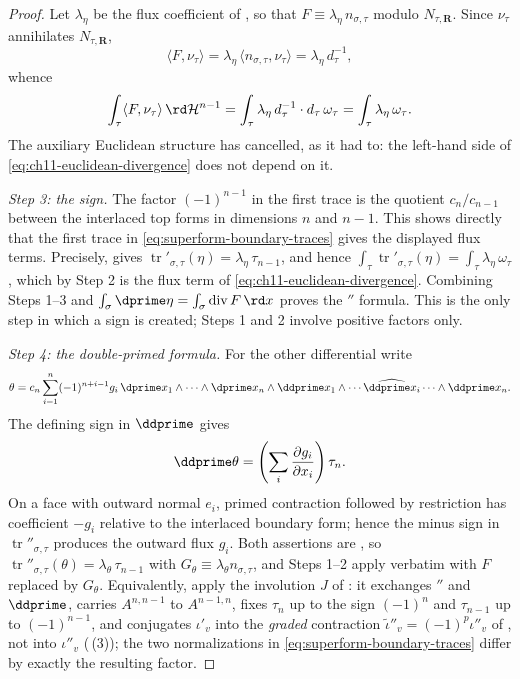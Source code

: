 \begin{proof}
Let $\lambda_\eta$ be the flux coefficient of
, so that $F\equiv\lambda_\eta\,n_{\sigma,\tau}$
modulo $N_{\tau,\mathbf R}$.  Since $\nu_\tau$ annihilates
$N_{\tau,\mathbf R}$,
\[
 \langle F,\nu_\tau\rangle
 =\lambda_\eta\,\langle n_{\sigma,\tau},\nu_\tau\rangle
 =\lambda_\eta\,d_\tau^{-1},
\]
whence
\[
 \int_\tau\langle F,\nu_\tau\rangle\,\rd\mathcal H^{n-1}
 =\int_\tau\lambda_\eta\,d_\tau^{-1}\cdot d_\tau\,\omega_\tau
 =\int_\tau\lambda_\eta\,\omega_\tau .
\]
The auxiliary Euclidean structure has cancelled, as it had to: the left-hand
side of \eqref{eq:ch11-euclidean-divergence} does not depend on it.

\smallskip
\emph{Step 3: the sign.}
The factor $(-1)^{n-1}$ in the first trace is the quotient
$c_n/c_{n-1}$ between the interlaced top forms in dimensions $n$ and
$n-1$.  This shows directly that the first trace in
\eqref{eq:superform-boundary-traces} gives the displayed flux terms.
Precisely,  gives
$\operatorname{tr}'_{\sigma,\tau}(\eta)=\lambda_\eta\,\tau_{n-1}$, and hence
$\int_\tau\operatorname{tr}'_{\sigma,\tau}(\eta)
=\int_\tau\lambda_\eta\,\omega_\tau$, which by Step 2 is the flux term of
\eqref{eq:ch11-euclidean-divergence}.  Combining Steps 1--3 and
$\int_\sigma\dprime\eta=\int_\sigma\operatorname{div}F\,\rd x$ proves the
$\dprime$ formula.  This is the only step in which a sign is created; Steps
1 and 2 involve positive factors only.

\smallskip
\emph{Step 4: the double-primed formula.}
For the other differential write
\[
 \theta=c_n\sum_{i=1}^n(-1)^{n+i-1}g_i\,
 \dprime x_1\wedge\cdots\wedge\dprime x_n
 \wedge\ddprime x_1\wedge\cdots
       \widehat{\ddprime x_i}\cdots\wedge\ddprime x_n.
\]
The defining sign in $\ddprime$ gives
\[
 \ddprime\theta=
 \left(\sum_i\frac{\partial g_i}{\partial x_i}\right)\tau_n.
\]
On a face with outward normal $e_i$, primed contraction followed by
restriction has coefficient $-g_i$ relative to the interlaced boundary
form; hence the minus sign in
$\operatorname{tr}''_{\sigma,\tau}$ produces the outward flux $g_i$.
Both assertions are , so
$\operatorname{tr}''_{\sigma,\tau}(\theta)=\lambda_\theta\,\tau_{n-1}$ with
$G_\theta\equiv\lambda_\theta n_{\sigma,\tau}$, and Steps 1--2 apply
verbatim with $F$ replaced by $G_\theta$.  Equivalently, apply the
involution $J$ of : it exchanges $\dprime$ and
$\ddprime$, carries $A^{n,n-1}$ to $A^{n-1,n}$, fixes $\tau_n$ up to the
sign $(-1)^n$ and $\tau_{n-1}$ up to $(-1)^{n-1}$, and conjugates $\iota'_v$
into the \emph{graded} contraction $\widetilde\iota''_v=(-1)^p\iota''_v$ of
, not into $\iota''_v$
(\,(3)); the two normalizations in
\eqref{eq:superform-boundary-traces} differ by exactly the resulting
factor.
\end{proof}

